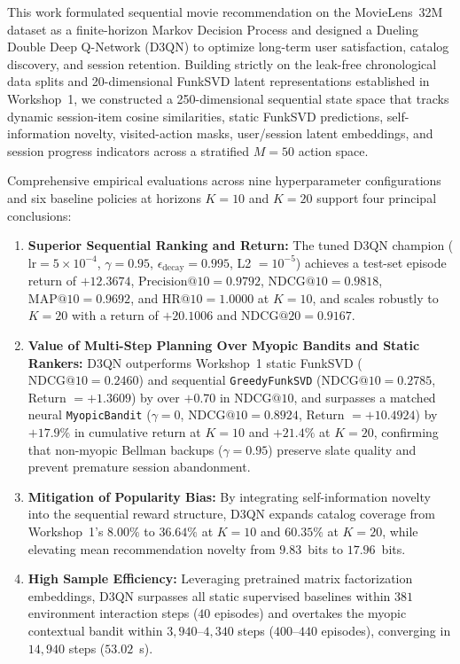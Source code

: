 This work formulated sequential movie recommendation on the MovieLens~32M dataset as a finite-horizon Markov Decision Process and designed a Dueling Double Deep Q-Network (D3QN) to optimize long-term user satisfaction, catalog discovery, and session retention. Building strictly on the leak-free chronological data splits and 20-dimensional FunkSVD latent representations established in Workshop~1, we constructed a 250-dimensional sequential state space that tracks dynamic session-item cosine similarities, static FunkSVD predictions, self-information novelty, visited-action masks, user/session latent embeddings, and session progress indicators across a stratified $M=50$ action space.

Comprehensive empirical evaluations across nine hyperparameter configurations and six baseline policies at horizons $K=10$ and $K=20$ support four principal conclusions:
\begin{enumerate}
    \item \textbf{Superior Sequential Ranking and Return:} The tuned D3QN champion ($\text{lr}=5\times 10^{-4}$, $\gamma=0.95$, $\epsilon_{\text{decay}}=0.995$, L2 $= 10^{-5}$) achieves a test-set episode return of $+12.3674$, $\text{Precision@10} = 0.9792$, $\text{NDCG@10} = 0.9818$, $\text{MAP@10} = 0.9692$, and $\text{HR@10} = 1.0000$ at $K=10$, and scales robustly to $K=20$ with a return of $+20.1006$ and $\text{NDCG@20} = 0.9167$.
    \item \textbf{Value of Multi-Step Planning Over Myopic Bandits and Static Rankers:} D3QN outperforms Workshop~1 static FunkSVD ($\text{NDCG@10} = 0.2460$) and sequential \texttt{GreedyFunkSVD} ($\text{NDCG@10} = 0.2785$, Return $= +1.3609$) by over $+0.70$ in $\text{NDCG@10}$, and surpasses a matched neural \texttt{MyopicBandit} ($\gamma=0$, $\text{NDCG@10} = 0.8924$, Return $= +10.4924$) by $+17.9\%$ in cumulative return at $K=10$ and $+21.4\%$ at $K=20$, confirming that non-myopic Bellman backups ($\gamma=0.95$) preserve slate quality and prevent premature session abandonment.
    \item \textbf{Mitigation of Popularity Bias:} By integrating self-information novelty into the sequential reward structure, D3QN expands catalog coverage from Workshop~1's $8.00\%$ to $36.64\%$ at $K=10$ and $60.35\%$ at $K=20$, while elevating mean recommendation novelty from $9.83$~bits to $17.96$~bits.
    \item \textbf{High Sample Efficiency:} Leveraging pretrained matrix factorization embeddings, D3QN surpasses all static supervised baselines within $381$ environment interaction steps ($40$ episodes) and overtakes the myopic contextual bandit within $3,940$--$4,340$ steps ($400$--$440$ episodes), converging in $14,940$ steps ($53.02$~s).
\end{enumerate}

